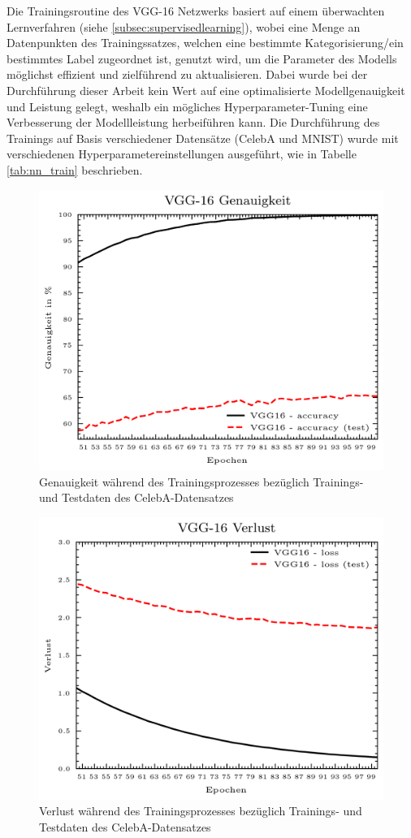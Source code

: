 Die Trainingsroutine des VGG-16 Netzwerks basiert auf einem überwachten Lernverfahren (siehe \ref{subsec:supervisedlearning}), wobei eine Menge an Datenpunkten des Trainingssatzes, welchen eine bestimmte Kategorisierung/ein bestimmtes Label zugeordnet ist, genutzt wird, um die Parameter des Modells möglichst effizient und zielführend zu aktualisieren. Dabei wurde bei der Durchführung dieser Arbeit kein Wert auf eine optimalisierte Modellgenauigkeit und Leistung gelegt, weshalb ein mögliches Hyperparameter-Tuning eine Verbesserung der Modellleistung herbeiführen kann. Die Durchführung des Trainings auf Basis verschiedener Datensätze (CelebA und MNIST) wurde mit verschiedenen Hyperparametereinstellungen ausgeführt, wie in Tabelle \ref{tab:nn_train} beschrieben.
\begin{figure}[H]
	\centering
	\includegraphics[width=0.5\linewidth]{Bilder/celeba_nn_acc.png}
	\caption{Genauigkeit während des Trainingsprozesses bezüglich Trainings- und Testdaten des CelebA-Datensatzes}
	\label{img:celeba_nn_acc}
\end{figure}

\begin{figure}[H]
	\centering
	\includegraphics[width=0.5\linewidth]{Bilder/celeba_nn_loss.png}
	\caption{Verlust während des Trainingsprozesses bezüglich Trainings- und Testdaten des CelebA-Datensatzes}
	\label{img:celeba_nn_loss}
\end{figure}

